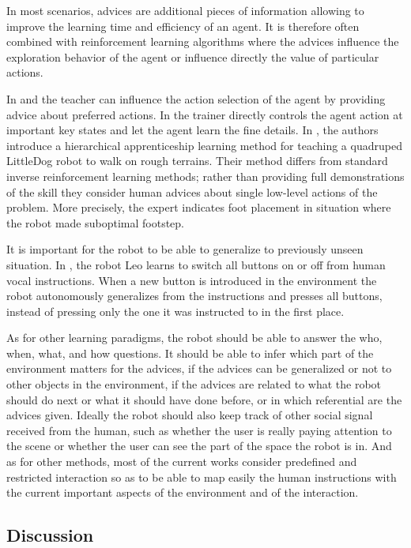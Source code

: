 In most scenarios, advices are additional pieces of information allowing to improve the learning time and efficiency of an agent. It is therefore often combined with reinforcement learning algorithms where the advices influence the exploration behavior of the agent or influence directly the value of particular actions. 

In \cite{clouse1992teaching} and \cite{maclin2005giving} the teacher can influence the action selection of the agent by providing advice about preferred actions. In  \cite{smart2002effective} the trainer directly controls the agent action at important key states and let the agent learn the fine details. In \cite{kolter2007hierarchical}, the authors introduce a hierarchical apprenticeship learning method for teaching a quadruped LittleDog robot to walk on rough terrains. Their method differs from standard inverse reinforcement learning methods; rather than providing full demonstrations of the skill they consider human advices about single low-level actions of the problem. More precisely, the expert indicates foot placement in situation where the robot made suboptimal footstep.

It is important for the robot to be able to generalize to previously unseen situation. In \cite{lockerd2004tutelage}, the robot Leo learns to switch all buttons on or off from human vocal instructions. When a new button is introduced in the environment the robot autonomously generalizes from the instructions and presses all buttons, instead of pressing only the one it was instructed to in the first place.


As for other learning paradigms, the robot should be able to answer the who, when, what, and how questions. It should be able to infer which part of the environment matters for the advices, if the advices can be generalized or not to other objects in the environment, if the advices are related to what the robot should do next or what it should have done before, or in which referential are the advices given. Ideally the robot should also keep track of other social signal received from the human, such as whether the user is really paying attention to the scene or whether the user can see the part of the space the robot is in. And as for other methods, most of the current works consider predefined and restricted interaction so as to be able to map easily the human instructions with the current important aspects of the environment and of the interaction.

\subsection{Discussion}

